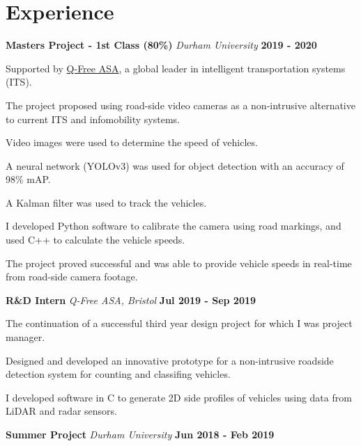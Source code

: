 \documentclass[a4paper, 11pt, hidelinks]{article}
\newcommand{\xp}[3]{
	\vspace{0.25em}
	\textbf{\large#1} \quad \emph{\large#2} \hfill \textbf{\large#3}
}
\begin{document}
	\begin{minipage}{0.587\textwidth}
		\vspace{-0.25em}
		
		\section{Experience}
		\xp{Masters Project - 1st Class (80\%)}{Durham University}{2019 - 2020}
		\begin{itemise}
			\item Supported by \href{https://www.q-free.com/}{Q-Free ASA}, a global leader in intelligent transportation systems (ITS).
			\item The project proposed using road-side video cameras as a non-intrusive alternative to current ITS and infomobility systems.
			\item Video images were used to determine the speed of vehicles.
			\item A neural network (YOLOv3) was used for object detection with an accuracy of 98\% mAP.
			\item A Kalman filter was used to track the vehicles.
			\item I developed Python software to calibrate the camera using road markings, and used C++ to calculate the vehicle speeds.
			\item The project proved successful and was able to provide vehicle speeds in real-time from road-side camera footage.
			\hfill
			\href{http://www.francisgurr.com/pages/masters_project/masters_project.html}{\faExternalLink}
		\end{itemise}
		\xp{R\&D Intern}{Q-Free ASA, Bristol}{Jul 2019 - Sep 2019}
		\begin{itemise}
			\item The continuation of a successful third year design project for which I was project manager.
			\item Designed and developed an innovative prototype for a non-intrusive roadside detection system for counting and classifing vehicles.
			\item I developed software in C to generate 2D side profiles of vehicles using data from LiDAR and radar sensors.
			\hfill
			\href{http://www.francisgurr.com/pages/qfree_internship/qfree_internship.html}{\faExternalLink}
		\end{itemise}
		\xp{Summer Project}{Durham University}{Jun 2018 - Feb 2019}
		\begin{itemise}

\end{itemise}
\end{minipage}
\end{document}
